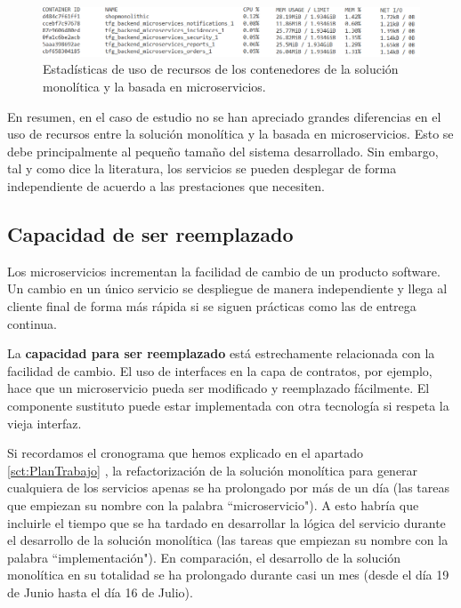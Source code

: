 \documentclass[11pt,spanish,listoffigures]{tfgetsinf}
\begin{document}
\begin{figure}[h]
\centering
\includegraphics[scale=0.65]{useMemory}
\caption{Estadísticas de uso de recursos de los contenedores de la solución monolítica y la basada en microservicios.}
\label{fig:UsoRecursos}
\end{figure}

En resumen, en el caso de estudio no se han apreciado grandes diferencias en el uso de recursos entre la solución monolítica y la basada en microservicios. Esto se debe principalmente al pequeño tamaño del sistema desarrollado. Sin embargo, tal y como dice la literatura, los servicios se pueden desplegar de forma independiente de acuerdo a las prestaciones que necesiten.

\subsection{Capacidad de ser reemplazado}

Los microservicios incrementan la facilidad de cambio de un producto software. Un cambio en un único servicio se despliegue de manera independiente y llega al cliente final de forma más rápida si se siguen prácticas como las de entrega continua.

La \textbf{capacidad para ser reemplazado} está estrechamente relacionada con la facilidad de cambio. El uso de interfaces en la capa de contratos, por ejemplo, hace que un microservicio pueda ser modificado y reemplazado fácilmente. El componente sustituto puede estar implementada con otra tecnología si respeta la vieja interfaz.

Si recordamos el cronograma que hemos explicado en el apartado \ref{sct:PlanTrabajo} , la refactorización de la solución monolítica para generar cualquiera de los servicios apenas se ha prolongado por más de un día (las tareas que empiezan su nombre con la palabra ``microservicio"). A esto habría que incluirle el tiempo que se ha tardado en desarrollar la lógica del servicio durante el desarrollo de la solución monolítica (las tareas que empiezan su nombre con la palabra ``implementación"). En comparación, el desarrollo de la solución monolítica en su totalidad se ha prolongado durante casi un mes (desde el día 19 de Junio hasta el día 16 de Julio).
\end{document}
